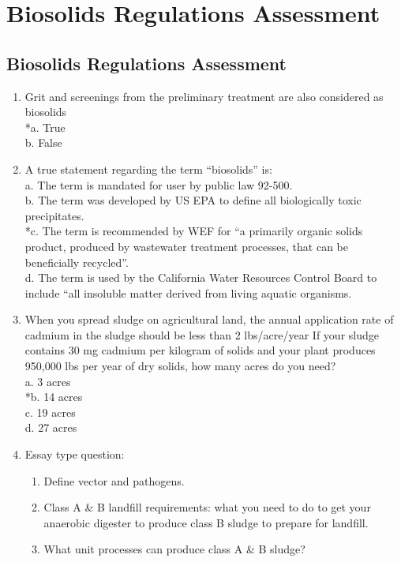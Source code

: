 
\chapter{Biosolids Regulations Assessment}

\section*{Biosolids Regulations Assessment}
\begin{enumerate}

\item  Grit and screenings from the preliminary treatment are also considered as biosolids \\

*a. True \\
b. False \\

\item  A true statement regarding the term “biosolids” is: \\

a. The term is mandated for user by public law 92-500. \\
b. The term was developed by US EPA to define all biologically toxic precipitates. \\
*c. The term is recommended by WEF for “a primarily organic solids product, produced by wastewater treatment processes, that can be beneficially recycled”. \\
d. The term is used by the California Water Resources Control Board to include “all insoluble matter derived from living aquatic organisms. \\

\item  When you spread sludge on agricultural land, the annual application rate of cadmium in the sludge should be less than 2 lbs/acre/year If your sludge contains 30 mg cadmium per kilogram of solids and your plant produces 950,000 lbs per year of dry solids, how many acres do you need? \\

a. 3 acres \\
*b. 14 acres \\
c. 19 acres \\
d. 27 acres \\
\newpage
\item Essay type question:\\
\begin{enumerate}
\item Define vector and pathogens.
\item Class A \& B landfill requirements: what you need to do to get your anaerobic digester to produce class B sludge to prepare for landfill.
\item What unit processes can produce class A \& B sludge?
\end{enumerate}


\end{enumerate}
